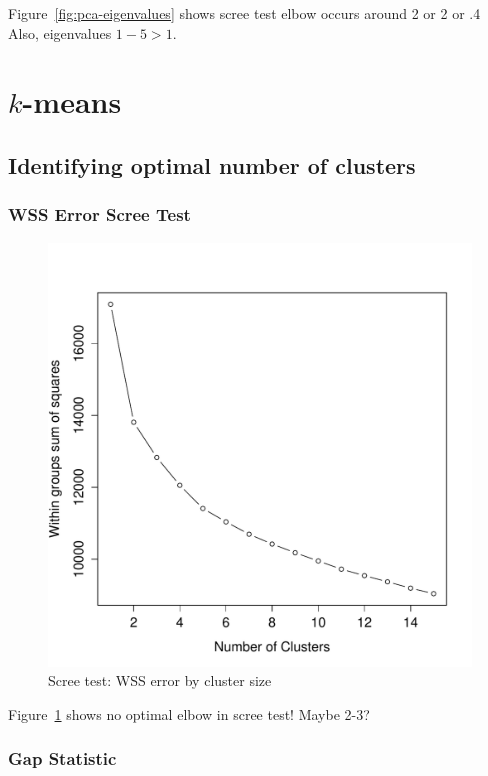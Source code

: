 \documentclass[letterpaper,12pt]{article}
\begin{document}
Figure~\ref{fig:pca-eigenvalues} shows scree test elbow occurs around 2 or 2 or
.4 Also, eigenvalues $1-5 > 1$.

\clearpage
\section{$k$-means}
\subsection{Identifying optimal number of clusters}

\subsubsection{WSS Error Scree Test}

\begin{figure}[h]
  \centering
  \includegraphics[width=\linewidth]{kmeans-wss-error.pdf}
  \caption{Scree test: WSS error by cluster size}
  \label{fig:kmeans-wss-error}
\end{figure}

Figure~\ref{fig:kmeans-wss-error} shows no optimal elbow in scree test! Maybe 2-3?

\subsubsection{Gap Statistic}
\end{document}
